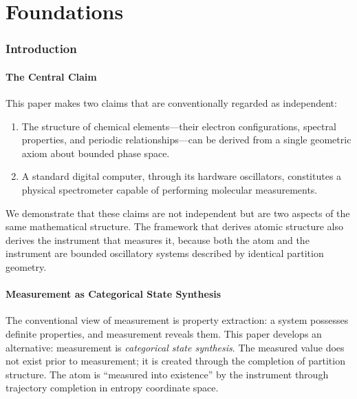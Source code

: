 \documentclass[11pt,twocolumn,a4paper]{article}
\theoremstyle{definition}
\theoremstyle{remark}
\begin{document}

\part{Foundations}

\section{Introduction}
\label{sec:introduction}

\subsection{The Central Claim}

This paper makes two claims that are conventionally regarded as independent:

\begin{enumerate}
\item The structure of chemical elements---their electron configurations, spectral properties, and periodic relationships---can be derived from a single geometric axiom about bounded phase space.
\item A standard digital computer, through its hardware oscillators, constitutes a physical spectrometer capable of performing molecular measurements.
\end{enumerate}

We demonstrate that these claims are not independent but are two aspects of the same mathematical structure. The framework that derives atomic structure also derives the instrument that measures it, because both the atom and the instrument are bounded oscillatory systems described by identical partition geometry.

\subsection{Measurement as Categorical State Synthesis}

The conventional view of measurement is property extraction: a system possesses definite properties, and measurement reveals them. This paper develops an alternative: measurement is \emph{categorical state synthesis}. The measured value does not exist prior to measurement; it is created through the completion of partition structure. The atom is ``measured into existence'' by the instrument through trajectory completion in entropy coordinate space.
\end{document}
